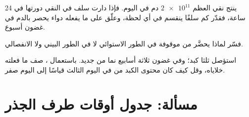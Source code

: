 \begin{exercise}[$\star\star\star$]\label{exo:g11:cell-cycle-mitosis:13}
ينتج نقي العظم $\num{2e11}$  دم في اليوم. فإذا دارت  سلف في
النقي دورتها في 24 ساعة، فقدّر كم سلفًا ينقسم في أي لحظة، وعلّق على ما
يفعله دواء يحصر  بالدم في غضون أسبوع.
\end{exercise}

\begin{exercise}[$\star\star\star$]\label{exo:g11:cell-cycle-mitosis:14}
فسّر لماذا يحضَّر  من  موقوفة في الطور الاستوائي لا
في الطور البيني ولا الانفصالي.
\end{exercise}

\begin{exercise}[$\star\star\star$]\label{exo:g11:cell-cycle-mitosis:15}
استؤصل ثلثا كبد؛ وفي غضون ثلاثة أسابيع نما من جديد. باستعمال ، صف ما فعلته خلاياه، وقل كيف كان محتوى  الكبد من  في
اليوم الثالث قياسًا إلى اليوم صفر.
\end{exercise}

\section{مسألة: جدول أوقات طرف الجذر}

